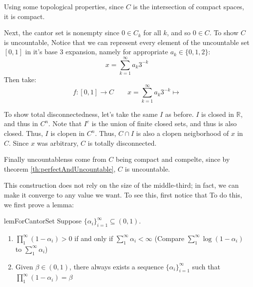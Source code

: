 \documentclass[oneside]{book}
\newcommand{\N}{\mathbb{N}}
\newcommand{\R}{\mathbb{R}}
\newcommand{\sse}{\subseteq}
\newcommand{\rw}{\rightarrow}
\begin{document}
\begin{Proof}
	Using some topological properties, since $C$ is the intersection of compact spaces,  it is compact.

	Next, the cantor set is nonempty since $0 \in C_k$ for all $k$, and so $0 \in C$. To show $C$ is uncountable, Notice
	that we can represent every element of the uncountable set $[0,1]$ in it's base $3$ expansion, namely for
	appropriate $a_k \in \{0,1,2\}$:
	\[
		x = \sum_{k=1}^\infty a_k3^{-k}
	\]
	Then take:
	\[
		f: [0,1] \rw C \qquad x = \sum_{k=1}^\infty a_k3^{-k} \mapsto 
	\]


	To show total disconnectedness, let's take the same $I$ as before. $I$ is closed in $\R$, and thus in $C^n$. Note
	that $I^c$ is the union of finite closed sets, and thus is also closed. Thus, $I$ is clopen in $C^n$. Thus, $C
	\cap I$ is also a clopen neigborhood of $x$ in $C$. Since $x$ was arbitrary, $C$ is totally disconnected. 

	Finally uncountablenss come from $C$ being compact and compelte, since by theorem \ref{th:perfectAndUncountable},
	$C$ is uncountable. 
\end{Proof}

This construction
does not rely on the size of the middle-third; in fact, we can make it converge to any value we want. To see this, first
notice that To do this, we
first prove a lemma:

\begin{lem}{}{lemForCantorSet}
	Suppose $\{\alpha_i\}_{i=1}^\infty \sse (0,1)$.
	\begin{enumerate}
		\item $\prod_1^\infty (1-\alpha_i) > 0$ if and only if $\sum_1^\infty \alpha_i <\infty$ (Compare
			$\sum_1^\infty \log(1-\alpha_i)$ to $\sum_1^\infty \alpha_i$)
		\item Given $\beta \in (0,1)$, there always exists a sequence $\{\alpha_i\}_{i=1}^\infty$ such that $\prod_1^\infty
			(1-\alpha_i)  = \beta$
	\end{enumerate}
\end{lem}
\end{document}

